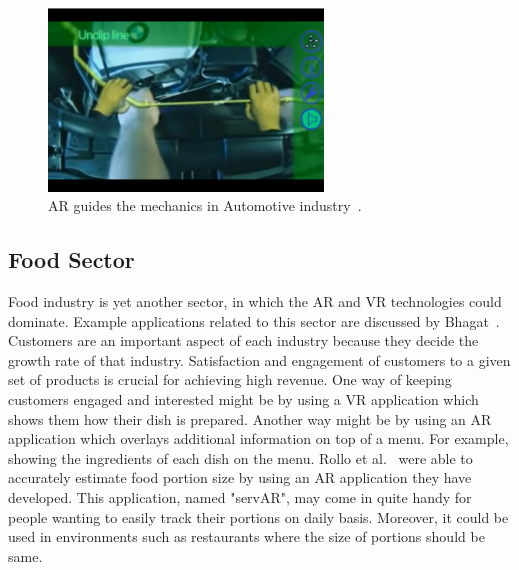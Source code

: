 \documentclass[12pt]{article}
\begin{document}
\begin{figure} [ht]
    \centering
    \includegraphics[width=0.65\textwidth]{../images/BMW.png}
    \caption{AR guides the mechanics in Automotive industry~\cite{industry}.}
    \label{fig:automotive}
\end{figure}

\subsection{Food Sector} \label{sec:Food Sector}
Food industry is yet another sector, in which the \ac{AR} and \ac{VR} technologies could dominate. Example applications related to this sector are discussed by Bhagat~\cite{food}. Customers are an important aspect of each industry because they decide the growth rate of that industry. Satisfaction and engagement of customers to a given set of products is crucial for achieving high revenue. One way of keeping customers engaged and interested might be by using a \ac{VR} application which shows them how their dish is prepared. Another way might be by using an \ac{AR} application which overlays additional information on top of a menu. For example, showing the ingredients of each dish on the menu. Rollo et al.~\cite{servAR} were able to accurately estimate food portion size by using an \ac{AR} application they have developed. This application, named "servAR", may come in quite handy for people wanting to easily track their portions on daily basis. Moreover, it could be used in environments such as restaurants where the size of portions should be same.
\end{document}
